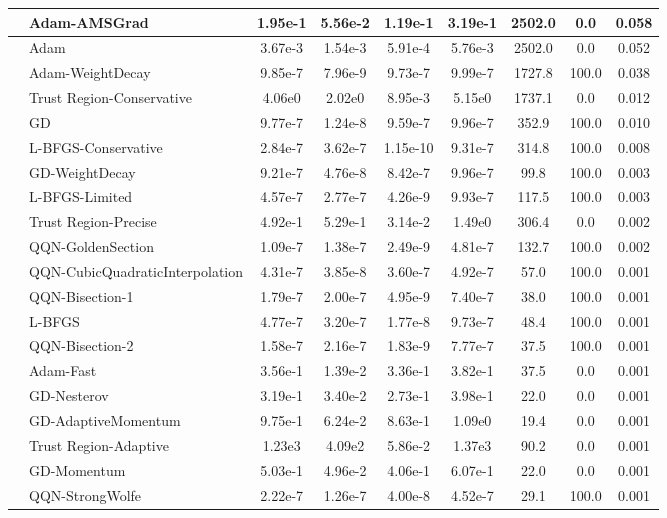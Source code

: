 \documentclass{article}
\begin{document}
\begin{longtable}{|l|l|c|c|c|c|c|c|c|}
\hline
 & Adam-AMSGrad & 1.95e-1 & 5.56e-2 & 1.19e-1 & 3.19e-1 & 2502.0 & 0.0 & 0.058 \\
\hline
 & Adam & 3.67e-3 & 1.54e-3 & 5.91e-4 & 5.76e-3 & 2502.0 & 0.0 & 0.052 \\
\hline
 & Adam-WeightDecay & 9.85e-7 & 7.96e-9 & 9.73e-7 & 9.99e-7 & 1727.8 & 100.0 & 0.038 \\
\hline
 & Trust Region-Conservative & 4.06e0 & 2.02e0 & 8.95e-3 & 5.15e0 & 1737.1 & 0.0 & 0.012 \\
\hline
 & GD & 9.77e-7 & 1.24e-8 & 9.59e-7 & 9.96e-7 & 352.9 & 100.0 & 0.010 \\
\hline
 & L-BFGS-Conservative & 2.84e-7 & 3.62e-7 & 1.15e-10 & 9.31e-7 & 314.8 & 100.0 & 0.008 \\
\hline
 & GD-WeightDecay & 9.21e-7 & 4.76e-8 & 8.42e-7 & 9.96e-7 & 99.8 & 100.0 & 0.003 \\
\hline
 & L-BFGS-Limited & 4.57e-7 & 2.77e-7 & 4.26e-9 & 9.93e-7 & 117.5 & 100.0 & 0.003 \\
\hline
 & Trust Region-Precise & 4.92e-1 & 5.29e-1 & 3.14e-2 & 1.49e0 & 306.4 & 0.0 & 0.002 \\
\hline
 & QQN-GoldenSection & 1.09e-7 & 1.38e-7 & 2.49e-9 & 4.81e-7 & 132.7 & 100.0 & 0.002 \\
\hline
 & QQN-CubicQuadraticInterpolation & 4.31e-7 & 3.85e-8 & 3.60e-7 & 4.92e-7 & 57.0 & 100.0 & 0.001 \\
\hline
 & QQN-Bisection-1 & 1.79e-7 & 2.00e-7 & 4.95e-9 & 7.40e-7 & 38.0 & 100.0 & 0.001 \\
\hline
 & L-BFGS & 4.77e-7 & 3.20e-7 & 1.77e-8 & 9.73e-7 & 48.4 & 100.0 & 0.001 \\
\hline
 & QQN-Bisection-2 & 1.58e-7 & 2.16e-7 & 1.83e-9 & 7.77e-7 & 37.5 & 100.0 & 0.001 \\
\hline
 & Adam-Fast & 3.56e-1 & 1.39e-2 & 3.36e-1 & 3.82e-1 & 37.5 & 0.0 & 0.001 \\
\hline
 & GD-Nesterov & 3.19e-1 & 3.40e-2 & 2.73e-1 & 3.98e-1 & 22.0 & 0.0 & 0.001 \\
\hline
 & GD-AdaptiveMomentum & 9.75e-1 & 6.24e-2 & 8.63e-1 & 1.09e0 & 19.4 & 0.0 & 0.001 \\
\hline
 & Trust Region-Adaptive & 1.23e3 & 4.09e2 & 5.86e-2 & 1.37e3 & 90.2 & 0.0 & 0.001 \\
\hline
 & GD-Momentum & 5.03e-1 & 4.96e-2 & 4.06e-1 & 6.07e-1 & 22.0 & 0.0 & 0.001 \\
\hline
 & QQN-StrongWolfe & 2.22e-7 & 1.26e-7 & 4.00e-8 & 4.52e-7 & 29.1 & 100.0 & 0.001 \\

\end{longtable}
\end{document}
